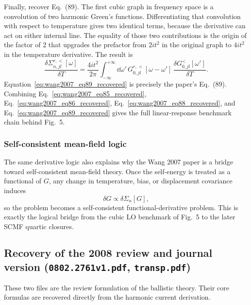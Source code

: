 Finally, recover Eq.~(89). The first cubic graph in frequency space is a convolution of two harmonic Green's functions. Differentiating that convolution with respect to temperature gives two identical terms, because the derivative can act on either internal line. The equality of those two contributions is the origin of the factor of $2$ that upgrades the prefactor from $2it^2$ in the original graph to $4it^2$ in the temperature derivative. The result is
\begin{equation}
    \frac{\delta \Sigma_{n,jl}^{r,<}[\omega]}{\delta T}
    =
    \frac{4it^2}{2\pi}
    \int_{-\infty}^{+\infty}\dd\omega'\,
    G_{0,jl}^{r,<}[\omega-\omega']\,
    \frac{\delta G_{0,jl}^<[\omega']}{\delta T}.
    \label{eq:wang2007_eq89_recovered}
\end{equation}
Equation~\eqref{eq:wang2007_eq89_recovered} is precisely the paper's Eq.~(89). Combining Eq.~\eqref{eq:wang2007_eq85_recovered}, Eq.~\eqref{eq:wang2007_eq86_recovered}, Eq.~\eqref{eq:wang2007_eq88_recovered}, and Eq.~\eqref{eq:wang2007_eq89_recovered} gives the full linear-response benchmark chain behind Fig.~5.

\subsubsection{Self-consistent mean-field logic}
The same derivative logic also explains why the Wang 2007 paper is a bridge toward self-consistent mean-field theory. Once the self-energy is treated as a functional of $G$, any change in temperature, bias, or displacement covariance induces
\begin{equation}
    \delta G \propto \delta\Sigma_n[G],
\end{equation}
so the problem becomes a self-consistent functional-derivative problem. This is exactly the logical bridge from the cubic LO benchmark of Fig.~5 to the later SCMF quartic closures.

\subsection{Recovery of the 2008 review and journal version (\texttt{0802.2761v1.pdf}, \texttt{transp.pdf})}
These two files are the review formulation of the ballistic theory. Their core formulas are recovered directly from the harmonic current derivation.

